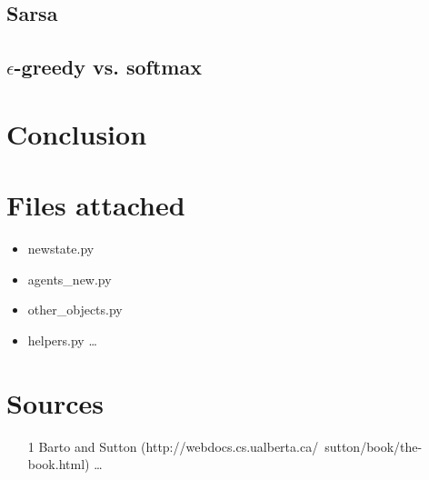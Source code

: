 \documentclass{article}
\begin{document}
\subsection*{Sarsa}
\subsection*{$\epsilon$-greedy vs. softmax}

\section*{Conclusion}

\section*{Files attached}
\begin{itemize}
\item newstate.py
\item agents\_new.py
\item other\_objects.py
\item helpers.py \ldots
\end{itemize}
\section*{Sources}

\begin{itemize}
	\item [1] Barto and Sutton (http://webdocs.cs.ualberta.ca/~sutton/book/the-book.html) \ldots
\end{itemize}
\end{document}
